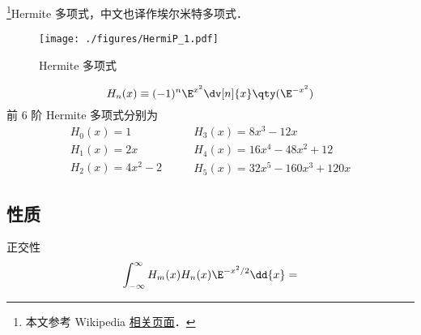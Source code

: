 
\begin{issues}
\issueDraft
\end{issues}

\footnote{本文参考 Wikipedia \href{https://en.wikipedia.org/wiki/Hermite_polynomials}{相关页面}．}Hermite 多项式，中文也译作埃尔米特多项式．

\begin{figure}[ht]
\centering
\texttt{[image: ./figures/HermiP\_1.pdf]}
\caption{Hermite 多项式} \label{HermiP_fig1}
\end{figure}

\begin{equation}
H_n(x) \equiv (- 1)^n \E^{x^2} \dv[n]{x} \qty(\E^{-x^2})
\end{equation}
前 6 阶 Hermite 多项式分别为
\begin{equation}
\begin{array}{l}
H_0(x) = 1\\
H_1(x) = 2x\\
H_2(x) = 4x^2 - 2
\end{array}
\qquad
\begin{array}{l}
H_3(x) = 8x^3 - 12x\\
H_4(x) = 16x^4 - 48x^2 + 12\\
H_5(x) = 32x^5 - 160x^3 + 120x
\end{array}
\end{equation}

\subsection{性质}
正交性
\begin{equation}
\int_{-\infty}^\infty H_m(x) H_n(x) \E^{-x^2/2} \dd{x} = 
\end{equation}

